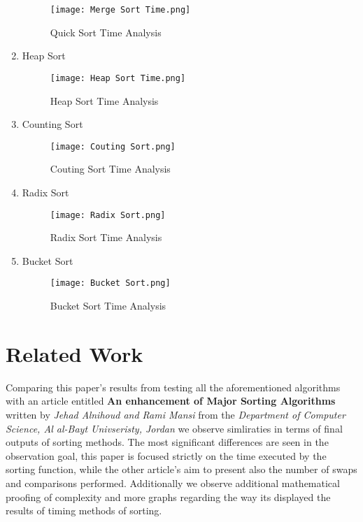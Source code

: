 \documentclass[11pt, letter paper]{article}
\begin{document}
\begin{enumerate}
\begin{figure}[h!]
                    \texttt{[image: Merge Sort Time.png]}
                    \caption{Quick Sort Time Analysis}
                    \label{fig:my_label}
                \end{figure}
                \item Heap Sort
                \begin{figure}[h!]
                    \centering
                    \texttt{[image: Heap Sort Time.png]}
                    \caption{Heap Sort Time Analysis}
                    \label{fig:my_label}
                \end{figure}
                \item Counting Sort
                \begin{figure}[h!]
                    \centering
                    \texttt{[image: Couting Sort.png]}
                    \caption{Couting Sort Time Analysis}
                    \label{fig:my_label}
                \end{figure}
                
                \item Radix Sort
                \begin{figure}
                    \centering
                    \texttt{[image: Radix Sort.png]}
                    \caption{Radix Sort Time Analysis}
                    \label{fig:my_label}
                \end{figure}
                \item Bucket Sort
                \begin{figure}[h]
                    \centering
                    \texttt{[image: Bucket Sort.png]}
                    \caption{Bucket Sort Time Analysis}
                    \label{fig:my_label}
                \end{figure}
        \end{enumerate}

        \section{Related Work}
        Comparing this paper's results from testing all the aforementioned algorithms with an article entitled \cite{enhance} \textbf{An enhancement of Major Sorting Algorithms} written by \emph{Jehad Alnihoud and Rami Mansi} from the \emph{Department of Computer Science, Al al-Bayt Univseristy, Jordan} we observe simliraties in terms of final outputs of sorting methods. The most significant differences are seen in the observation goal, this paper is focused strictly on the time executed by the sorting function, while the other article's aim to present also the number of swaps and comparisons performed. Additionally we observe additional mathematical proofing of complexity and more graphs regarding the way its displayed the results of timing methods of sorting.
\end{document}
